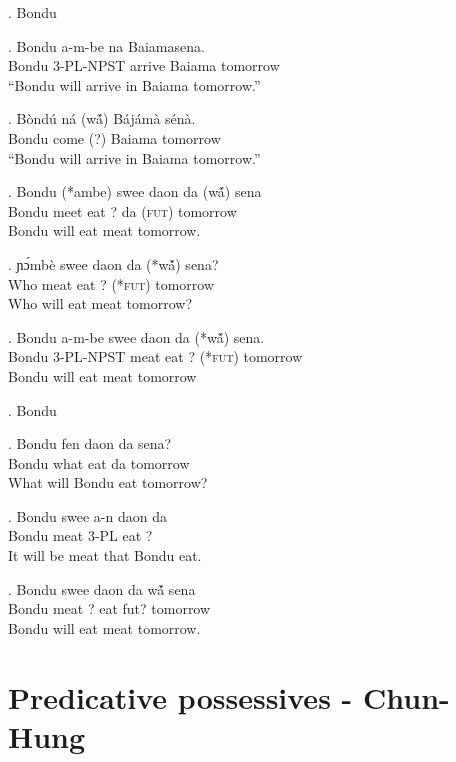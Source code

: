 \documentclass{assets/fieldnotes}
\begin{document}
\ex. Bondu

\ex. Bondu a-m-be na Baiamasena.\\
Bondu 3-PL-NPST arrive Baiama tomorrow\\
``Bondu will arrive in Baiama tomorrow.''

\exg. Bòndú ná (w\'ã) Bájámà sénà.\\
Bondu come (?) Baiama tomorrow\\
``Bondu will arrive in Baiama tomorrow.''

\exg. Bondu (*ambe) swee daon da (w\'ã) sena\\
Bondu meet eat ? da (\textsc{fut}) tomorrow\\
Bondu will eat meat tomorrow.

\exg. ɲɔ́mbè swee daon da (*w\'ã) sena?\\
Who meat eat ? (*\textsc{fut}) tomorrow\\
Who will eat meat tomorrow?

\exg. Bondu a-m-be swee daon da (*w\'ã) sena.\\
Bondu 3-PL-NPST meat eat ? (*\textsc{fut}) tomorrow\\
Bondu will eat meat tomorrow 

\ex. Bondu



\exg. Bondu fen daon da sena?\\
Bondu what eat da tomorrow\\
What will Bondu eat tomorrow?\\

\exg. Bondu swee a-n daon da\\
Bondu meat 3-PL eat ?\\
It will be meat that Bondu eat.

\exg. Bondu swee daon da w\'ã sena \\
Bondu meat ? eat fut? tomorrow\\
Bondu will eat meat tomorrow.

\section{Predicative possessives - Chun-Hung}
\end{document}
